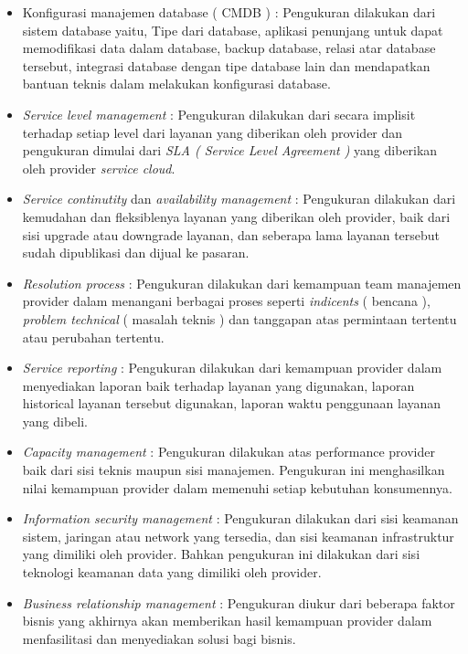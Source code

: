 \begin{itemize}
\item Konfigurasi manajemen database ( CMDB ) : Pengukuran dilakukan dari sistem database yaitu, Tipe dari database, aplikasi penunjang untuk dapat memodifikasi data dalam database, backup database, relasi atar database tersebut, integrasi database dengan tipe database lain dan mendapatkan bantuan teknis dalam melakukan konfigurasi database.\\
\item \textit{Service level management} : Pengukuran dilakukan dari secara implisit terhadap setiap level dari layanan yang diberikan oleh provider dan pengukuran dimulai dari \textit{SLA ( Service Level Agreement )} yang diberikan oleh provider \textit{service cloud}.
\item \textit{Service continutity} dan \textit{availability management} : Pengukuran dilakukan dari kemudahan dan fleksiblenya layanan yang diberikan oleh provider, baik dari sisi upgrade atau downgrade layanan, dan seberapa lama layanan tersebut sudah dipublikasi dan dijual ke pasaran.
\item \textit{Resolution process} : Pengukuran dilakukan dari kemampuan team manajemen provider dalam menangani berbagai proses seperti \textit{indicents} ( bencana ), \textit{problem technical} ( masalah teknis ) dan tanggapan atas permintaan tertentu atau perubahan tertentu.
\item \textit{Service reporting} : Pengukuran dilakukan dari kemampuan provider dalam menyediakan laporan baik terhadap layanan yang digunakan, laporan historical layanan tersebut digunakan, laporan waktu penggunaan layanan yang dibeli.
\item \textit{Capacity management} : Pengukuran dilakukan atas performance provider baik dari sisi teknis maupun sisi manajemen. Pengukuran ini menghasilkan nilai kemampuan provider dalam memenuhi setiap kebutuhan konsumennya.
\item \textit{Information security management} : Pengukuran dilakukan dari sisi keamanan sistem, jaringan atau network yang tersedia, dan sisi keamanan infrastruktur yang dimiliki oleh provider. Bahkan pengukuran ini dilakukan dari sisi teknologi keamanan data yang dimiliki oleh provider.
\item \textit{Business relationship management} : Pengukuran diukur dari beberapa faktor bisnis yang akhirnya akan memberikan hasil kemampuan provider dalam menfasilitasi dan menyediakan solusi bagi bisnis.
\end{itemize}
